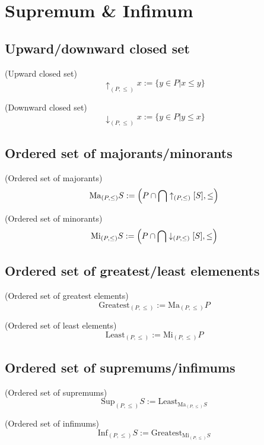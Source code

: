 \def\topic{Supremum \& Infimum}


\section{Supremum \& Infimum}
\subsection{Upward/downward closed set}
\begin{definition}(Upward closed set)
\[
\uparrow_{(P,\leq)}x:=\{y\in P|x\leq y\}
\]
\end{definition}
\begin{definition}(Downward closed set)
\[
\downarrow_{(P,\leq)}x:=\{y\in P|y\leq x\}
\]
\end{definition}

\subsection{Ordered set of majorants/minorants}
\begin{definition}(Ordered set of majorants)
\[
\mathrm{Ma}_{(P,\leq)}S:=\left(P\cap\bigcap \uparrow_{(P,\leq)}[S],\leq\right)
\]
\end{definition}
\begin{definition}(Ordered set of minorants)
\[
\mathrm{Mi}_{(P,\leq)}S:=\left(P\cap\bigcap \downarrow_{(P,\leq)}[S],\leq\right)
\]
\end{definition}
\subsection{Ordered set of greatest/least elemenents}
\begin{definition}(Ordered set of greatest elements)
\[
\mathrm{Greatest}_{(P,\leq)}:=\mathrm{Ma}_{(P,\leq)}P
\]
\end{definition}
\begin{definition}(Ordered set of least elements)
\[
\mathrm{Least}_{(P,\leq)}:=\mathrm{Mi}_{(P,\leq)}P
\]
\end{definition}
\subsection{Ordered set of supremums/infimums}
\begin{definition}(Ordered set of supremums)
\[
\mathrm{Sup}_{(P,\leq)}S:=\mathrm{Least}_{\mathrm{Ma}_{(P,\leq)}S}
\]
\end{definition}
\begin{definition}(Ordered set of infimums)
\[
\mathrm{Inf}_{(P,\leq)}S:=\mathrm{Greatest}_{\mathrm{Mi}_{(P,\leq)}S}
\]
\end{definition}





